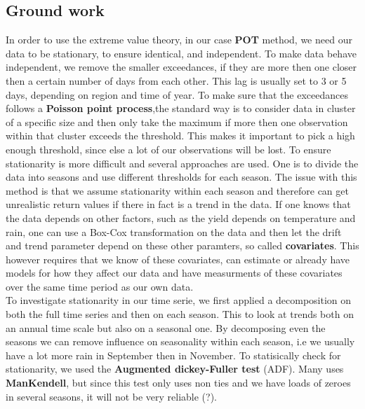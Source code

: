 \documentclass{article}
\begin{document}
	\subsection{Ground work}
	In order to use the extreme value theory, in our case \textbf{POT} method, we need our data to be stationary, to ensure identical, and independent. To make data behave independent, we remove the smaller exceedances, if they are more then one closer then a certain number of days from each other. This lag is usually set to 3 or 5 days, depending on region and time of year. To make sure that the exceedances follows a \textbf{Poisson point process},the standard way is to consider data in cluster of a specific size and then only take the maximum if more then one observation within that cluster exceeds the threshold. This makes it important to pick a high enough threshold, since else a lot of our observations will be lost.
	To ensure stationarity is more difficult and several approaches are used. One is to divide the data into seasons and use different thresholds for each season. The issue with this method is that we assume stationarity within each season and therefore can get unrealistic return values if there in fact is a trend in the data. If one knows that the data depends on other factors, such as the yield depends on temperature and rain, one can use a Box-Cox transformation on the data and then let the drift and trend parameter depend on these other paramters, so called \textbf{covariates}. This however requires that we know of these covariates, can estimate or already have models for how they affect our data and have measurments of these covariates over the same time period as our own data.\\
	To investigate stationarity in our time serie, we first applied a decomposition on both the full time series and then on each season. This to look at trends both on an annual time scale but also on a seasonal one. By decomposing even the seasons we can remove influence on seasonality within each season, i.e we usually have a lot more rain in September then in November. To statisically check for stationarity, we used the \textbf{Augmented dickey-Fuller test} (ADF). Many uses \textbf{ManKendell}, but since this test only uses non ties and we have loads of zeroes in several seasons, it will not be very reliable (?). 
	
\end{document}
